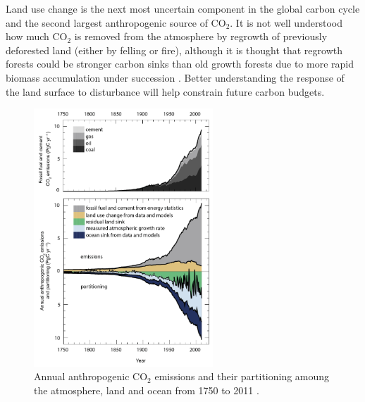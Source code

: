 \documentclass[11pt]{article}
\begin{document}
Land use change is the next most uncertain component in the global carbon cycle and the second largest anthropogenic source of CO\(_{2}\). It is not well understood how much CO\(_{2}\) is removed from the atmosphere by regrowth of previously deforested land (either by felling or fire), although it is thought that regrowth forests could be stronger carbon sinks than old growth forests due to more rapid biomass accumulation under succession \citep{pan2011large}. Better understanding the response of the land surface to disturbance will help constrain future carbon budgets. 





\begin{figure}[ht]
    \centering
    \includegraphics[width=0.6\textwidth]{ipcc_fig6_8.jpg}
    \caption{Annual anthropogenic CO\(_{2}\) emissions and their partitioning amoung the atmosphere, land and ocean from 1750 to 2011  \citep{ciais2014carbon}.}
    \label{fig:ipcc_fig6.8}
\end{figure}
\end{document}
